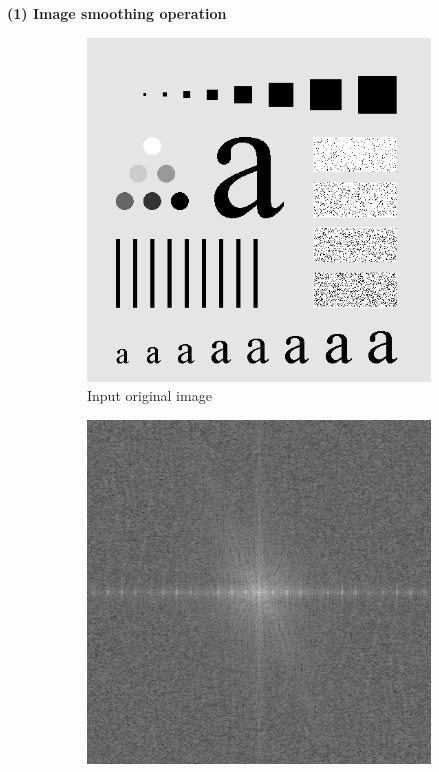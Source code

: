 \documentclass[UTF8]{ctexart}
\begin{document}
\textbf{\large (1) Image smoothing operation}
\begin{figure}[htbp]
    \centering
    \begin{subfigure}{0.3\textwidth}
        \centering
        \includegraphics[width=\linewidth]{test_pattern_blurring.png}
        \caption{Input original image}
    \end{subfigure}%
    \hfill
    \begin{subfigure}{0.3\textwidth}
        \centering
        \includegraphics[width=\linewidth]{pattern_spectrum.png}

\end{subfigure}
\end{figure}
\end{document}

